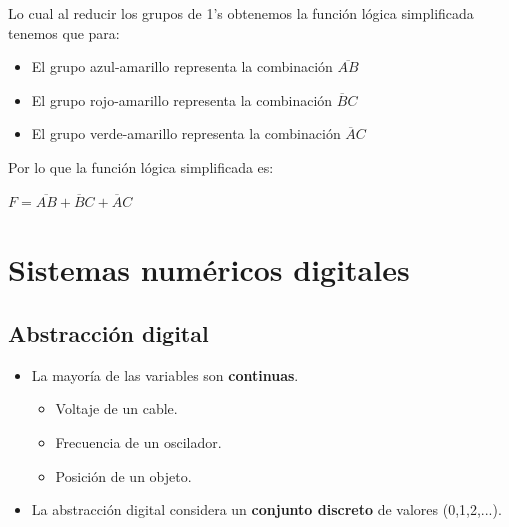 \documentclass{templateNote}
\begin{document}
\begin{tcolorbox}[colback=blue!10!white,colframe=blue!75!black,title=Ejemplo]
\begin{center}
\end{center}
Lo cual al reducir los grupos de 1's obtenemos la función lógica simplificada tenemos que para:
\begin{itemize}
    \item El grupo azul-amarillo representa la combinación $\overline{AB}$
    \item El grupo rojo-amarillo representa la combinación $\overline{B}C$
    \item El grupo verde-amarillo representa la combinación $\overline{A}C$
\end{itemize} 
Por lo que la función lógica simplificada es:
\begin{center}
    \textbf{$F = \overline{AB} + \overline{B}C + \overline{A}C$}       
\end{center}
\end{tcolorbox}
\newpage

\section{Sistemas numéricos digitales}
\subsection{Abstracción digital}
\begin{itemize}
    \item La mayoría de las variables son \textbf{continuas}.
    \begin{itemize}
        \item Voltaje de un cable.
        \item Frecuencia de un oscilador.
        \item Posición de un objeto.
    \end{itemize}
    \item La abstracción digital considera un \textbf{conjunto discreto} de valores (0,1,2,...).
\end{itemize}
\end{document}
